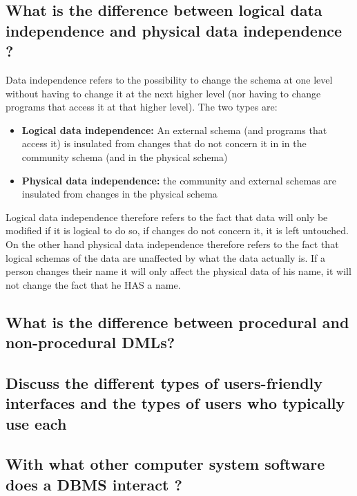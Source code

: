 \subsection{What is the difference between logical data independence and physical data independence ?}
Data independence refers to the possibility to change the schema at one level without having to change it at the next higher level (nor having to change programs that access it at that higher level). The two types are:
\begin{itemize}
	\item \textbf{Logical data independence:} An external schema (and programs that access it) is insulated from changes that do not concern it in in the community schema (and in the physical schema)
	\item \textbf{Physical data independence:} the community and external schemas are insulated from changes in the physical schema
\end{itemize}
Logical data independence therefore refers to the fact that data will only be modified if it is logical to do so, if changes do not concern it, it is left untouched.
On the other hand physical data independence therefore refers to the fact that logical schemas of the data are unaffected by what the data actually is. If a person changes their name it will only affect the physical data of his name, it will not change the fact that he HAS a name.

\subsection{What is the difference between procedural and non-procedural DMLs?}

\subsection{Discuss the different types of users-friendly interfaces and the types of users who typically use each}

\subsection{With what other computer system software does a DBMS interact ?}

